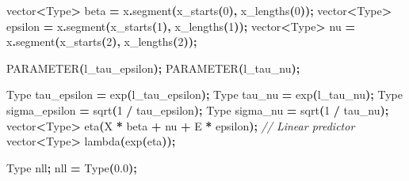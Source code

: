 \documentclass[a4paper, nobind]{templates/ociamthesis}
\newenvironment{Shaded}{\begin{snugshade}}{\end{snugshade}}
\newcommand{\CommentTok}[1]{\textcolor[rgb]{0.56,0.35,0.01}{\textit{#1}}}
\newcommand{\DecValTok}[1]{\textcolor[rgb]{0.00,0.00,0.81}{#1}}
\newcommand{\FloatTok}[1]{\textcolor[rgb]{0.00,0.00,0.81}{#1}}
\newcommand{\NormalTok}[1]{#1}
\newcommand{\OperatorTok}[1]{\textcolor[rgb]{0.81,0.36,0.00}{\textbf{#1}}}
\renewenvironment{Shaded}
{
  \vspace{10pt}%
  \begin{snugshade}%
}{%
  \end{snugshade}%
  \vspace{8pt}%
}
\begin{document}
\begin{Shaded}
\begin{Highlighting}[]
\NormalTok{  vector}\OperatorTok{\textless{}}\NormalTok{Type}\OperatorTok{\textgreater{}}\NormalTok{ beta }\OperatorTok{=}\NormalTok{ x}\OperatorTok{.}\NormalTok{segment}\OperatorTok{(}\NormalTok{x\_starts}\OperatorTok{(}\DecValTok{0}\OperatorTok{),}\NormalTok{ x\_lengths}\OperatorTok{(}\DecValTok{0}\OperatorTok{));}
\NormalTok{  vector}\OperatorTok{\textless{}}\NormalTok{Type}\OperatorTok{\textgreater{}}\NormalTok{ epsilon }\OperatorTok{=}\NormalTok{ x}\OperatorTok{.}\NormalTok{segment}\OperatorTok{(}\NormalTok{x\_starts}\OperatorTok{(}\DecValTok{1}\OperatorTok{),}\NormalTok{ x\_lengths}\OperatorTok{(}\DecValTok{1}\OperatorTok{));}
\NormalTok{  vector}\OperatorTok{\textless{}}\NormalTok{Type}\OperatorTok{\textgreater{}}\NormalTok{ nu }\OperatorTok{=}\NormalTok{ x}\OperatorTok{.}\NormalTok{segment}\OperatorTok{(}\NormalTok{x\_starts}\OperatorTok{(}\DecValTok{2}\OperatorTok{),}\NormalTok{ x\_lengths}\OperatorTok{(}\DecValTok{2}\OperatorTok{));}

\NormalTok{  PARAMETER}\OperatorTok{(}\NormalTok{l\_tau\_epsilon}\OperatorTok{);}
\NormalTok{  PARAMETER}\OperatorTok{(}\NormalTok{l\_tau\_nu}\OperatorTok{);}
  
\NormalTok{  Type tau\_epsilon }\OperatorTok{=}\NormalTok{ exp}\OperatorTok{(}\NormalTok{l\_tau\_epsilon}\OperatorTok{);}
\NormalTok{  Type tau\_nu }\OperatorTok{=}\NormalTok{ exp}\OperatorTok{(}\NormalTok{l\_tau\_nu}\OperatorTok{);}
\NormalTok{  Type sigma\_epsilon }\OperatorTok{=}\NormalTok{ sqrt}\OperatorTok{(}\DecValTok{1} \OperatorTok{/}\NormalTok{ tau\_epsilon}\OperatorTok{);}
\NormalTok{  Type sigma\_nu }\OperatorTok{=}\NormalTok{ sqrt}\OperatorTok{(}\DecValTok{1} \OperatorTok{/}\NormalTok{ tau\_nu}\OperatorTok{);}
\NormalTok{  vector}\OperatorTok{\textless{}}\NormalTok{Type}\OperatorTok{\textgreater{}}\NormalTok{ eta}\OperatorTok{(}\NormalTok{X }\OperatorTok{*}\NormalTok{ beta }\OperatorTok{+}\NormalTok{ nu }\OperatorTok{+}\NormalTok{ E }\OperatorTok{*}\NormalTok{ epsilon}\OperatorTok{);} \CommentTok{// Linear predictor}
\NormalTok{  vector}\OperatorTok{\textless{}}\NormalTok{Type}\OperatorTok{\textgreater{}}\NormalTok{ lambda}\OperatorTok{(}\NormalTok{exp}\OperatorTok{(}\NormalTok{eta}\OperatorTok{));}
  
\NormalTok{  Type nll}\OperatorTok{;}
\NormalTok{  nll }\OperatorTok{=}\NormalTok{ Type}\OperatorTok{(}\FloatTok{0.0}\OperatorTok{);}
  

\end{Highlighting}
\end{Shaded}
\end{document}
